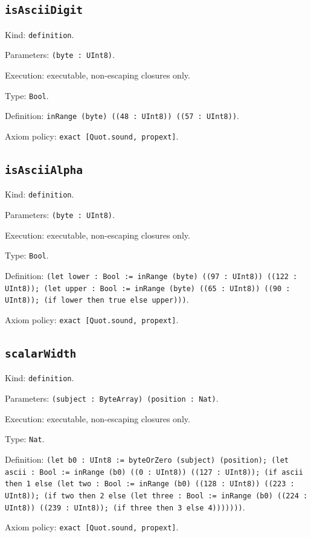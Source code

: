 \documentclass[11pt]{article}
\begin{document}
\subsection*{\texttt{isAsciiDigit}}
\noindent Kind: \texttt{definition}.\par
\noindent Parameters: \texttt{(byte : UInt8)}.\par
\noindent Execution: executable, non-escaping closures only.\par
\noindent Type: \texttt{Bool}.\par
\noindent Definition: \texttt{inRange (byte) ((48 : UInt8)) ((57 : UInt8))}.\par
\noindent Axiom policy: \texttt{exact [Quot.sound, propext]}.\par
\subsection*{\texttt{isAsciiAlpha}}
\noindent Kind: \texttt{definition}.\par
\noindent Parameters: \texttt{(byte : UInt8)}.\par
\noindent Execution: executable, non-escaping closures only.\par
\noindent Type: \texttt{Bool}.\par
\noindent Definition: \texttt{(let lower : Bool := inRange (byte) ((97 : UInt8)) ((122 : UInt8)); (let upper : Bool := inRange (byte) ((65 : UInt8)) ((90 : UInt8)); (if lower then true else upper)))}.\par
\noindent Axiom policy: \texttt{exact [Quot.sound, propext]}.\par
\subsection*{\texttt{scalarWidth}}
\noindent Kind: \texttt{definition}.\par
\noindent Parameters: \texttt{(subject : ByteArray) (position : Nat)}.\par
\noindent Execution: executable, non-escaping closures only.\par
\noindent Type: \texttt{Nat}.\par
\noindent Definition: \texttt{(let b0 : UInt8 := byteOrZero (subject) (position); (let ascii : Bool := inRange (b0) ((0 : UInt8)) ((127 : UInt8)); (if ascii then 1 else (let two : Bool := inRange (b0) ((128 : UInt8)) ((223 : UInt8)); (if two then 2 else (let three : Bool := inRange (b0) ((224 : UInt8)) ((239 : UInt8)); (if three then 3 else 4)))))))}.\par
\noindent Axiom policy: \texttt{exact [Quot.sound, propext]}.\par
\end{document}
